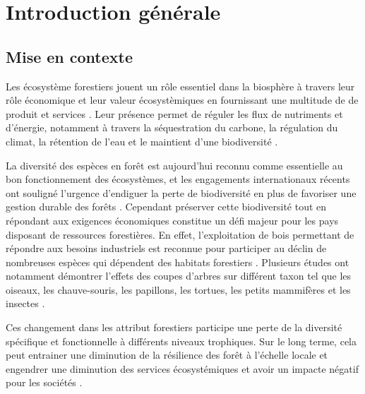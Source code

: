 \chapter*{Introduction générale}         %
\label{chap-introduction}       %


\section*{Mise en contexte}
\label{sec:contexte}

Les écosystème forestiers jouent un rôle essentiel dans la biosphère à travers leur rôle économique et leur valeur écosystèmiques en fournissant une multitude de de produit et services \citep{Balvanera2006Quantifyingevidence}. 
Leur présence permet de réguler les flux de nutriments et d'énergie, notamment à travers la séquestration du carbone, la régulation du climat, la rétention de l'eau et le maintient d'une biodiversité \citep{Balvanera2006Quantifyingevidence,Diaz2006BiodiversityLoss,Canadell2008Managingforests,Pawson2013Plantationforests}. 

La diversité des espèces en forêt est aujourd'hui reconnu comme essentielle au bon fonctionnement des écosystèmes, et les engagements internationaux récents ont souligné l'urgence d'endiguer la perte de biodiversité en plus de favoriser une gestion durable des forêts \citep{Scherer-Lorenzen2005ForestDiversity,Parviainen2007Maintenanceconservation}. 
Cependant préserver cette biodiversité tout en répondant aux exigences économiques constitue un défi majeur pour les pays disposant de ressources forestières. 
En effet, l'exploitation de bois permettant de répondre aux besoins industriels est reconnue pour participer au déclin de nombreuses espèces qui dépendent des habitats forestiers \citep{Bengtsson2000Biodiversitydisturbances}. 
Plusieurs études ont notamment démontrer l'effets des coupes d'arbres sur différent taxon tel que les oiseaux, les chauve-souris, les papillons, les tortues, les petits mammifères et les insectes \citep{Summerville2011Managingforest,Currylow2012ShortTermForest,Kaminski2013EffectsForest,Kellner2013Shorttermresponses,Caldwell2019ComparisonBat}. 

Ces changement dans les attribut forestiers participe une perte de la diversité spécifique et fonctionnelle à différents niveaux trophiques. 
Sur le long terme, cela peut entrainer une diminution de la résilience des forêt à l'échelle locale et engendrer une diminution des services écosystémiques et avoir un impacte négatif pour les sociétés \citep{Hooper2012globalsynthesis,Edwards2014Maintainingecosystem}. 

